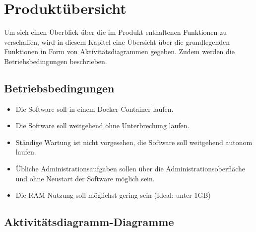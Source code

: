
\chapter{Produktübersicht}
\label{chap:product_overview}
Um sich einen Überblick über die im Produkt enthaltenen Funktionen zu verschaffen, wird in diesem Kapitel eine Übersicht über die grundlegenden Funktionen in Form von Aktivitätsdiagrammen gegeben.
Zudem werden die Betriebsbedingungen beschrieben.
\section{Betriebsbedingungen}
\begin{itemize}
    \item Die Software soll in einem \gls{Docker}-\gls{Container} laufen.
    \item Die Software soll weitgehend ohne Unterbrechung laufen.
    \item Ständige Wartung ist nicht vorgesehen, die Software soll weitgehend autonom laufen.
    \item Übliche Administrationsaufgaben sollen über die Administrationsoberfläche und ohne Neustart der Software möglich sein.
    \item Die \gls{RAM}-Nutzung soll möglichst gering sein (Ideal: unter 1GB)
\end{itemize}

\newpage
\section{Aktivitätsdiagramm-Diagramme}

